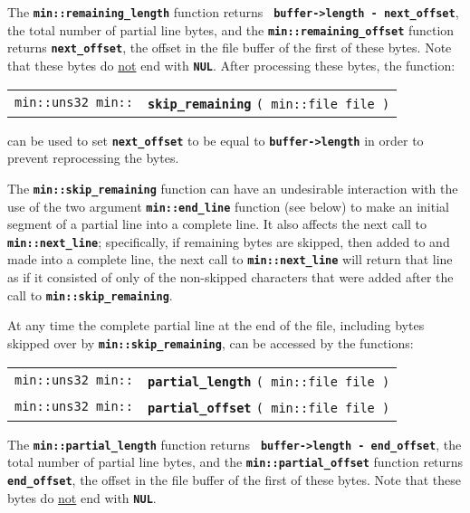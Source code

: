 \documentclass[12pt]{article}
\makeatletter
\newcommand{\TT}[1]{{\tt \bfseries #1}}
\newcommand{\ttindex}[1]{\index{#1@{\tt #1}}}
\newcommand{\EOL}{\penalty \exhyphenpenalty}
\newenvironment{indpar}[1][0.3in]%
	{\begin{list}{}%
		     {\setlength{\itemsep}{0in}%
		      \setlength{\topsep}{0in}%
		      \setlength{\parsep}{1ex}%
		      \setlength{\labelwidth}{#1}%
		      \setlength{\leftmargin}{#1}%
		      \addtolength{\leftmargin}{\labelsep}}%
	 \item}%
	{\end{list}}
\newcommand{\LABEL}[1]{\label{#1}}
\newcommand{\MINKEY}[1]%
	   {\TT{#1}\ttindex{min::#1}\ttindex{#1}}
\makeatother
\begin{document}
The \TT{min::\EOL remaining\_\EOL length}
function returns \TT{ buffer->\EOL length - next\_\EOL offset},
the total number of partial line bytes, and
the \TT{min::\EOL remaining\_\EOL offset} function returns
\TT{next\_\EOL offset},
the offset in the file buffer of the first of these bytes.
Note that these bytes do \underline{not} end with \TT{NUL}.
After processing these bytes, the function:

\begin{indpar}[1em]\begin{tabular}{r@{}l}
\verb|min::uns32 min::|
    & \MINKEY{skip\_\EOL remaining} \verb|( min::file file )|
\LABEL{MIN::SKIP_REMAINING} \\
\end{tabular}\end{indpar}

can be used to set \TT{next\_\EOL offset}
to be equal to \TT{buffer->\EOL length} in order to
prevent reprocessing the bytes.

The \TT{min::skip\_remaining} function can have an undesirable
interaction with the use of the two argument \TT{min::\EOL end\_\EOL line}
function (see below) to
make an initial segment of a partial line into a complete line.
It also affects the next
call to \TT{min::\EOL next\_\EOL line}; specifically, if remaining
bytes are skipped, then added to and made into a complete line,
the next call to \TT{min::\EOL next\_\EOL line} will return that line as if
it consisted of only of the non-skipped characters that were added
after the call to \TT{min::\EOL skip\_\EOL remaining}.

At any time the complete partial line at the end of the file, including
bytes skipped over by \TT{min::\EOL skip\_\EOL remaining}, can be
accessed by the functions:

\begin{indpar}[1em]\begin{tabular}{r@{}l}
\verb|min::uns32 min::|
    & \MINKEY{partial\_\EOL length} \verb|( min::file file )|
\LABEL{MIN::PARTIAL_LENGTH} \\
\verb|min::uns32 min::|
    & \MINKEY{partial\_\EOL offset} \verb|( min::file file )|
\LABEL{MIN::PARTIAL_OFFSET} \\
\end{tabular}\end{indpar}

The \TT{min::\EOL partial\_\EOL length}
function returns \TT{ buffer->\EOL length - end\_\EOL offset},
the total number of partial line bytes, and
the \TT{min::\EOL partial\_\EOL offset} function returns
\TT{end\_\EOL offset},
the offset in the file buffer of the first of these bytes.
Note that these bytes do \underline{not} end with \TT{NUL}.
\end{document}

